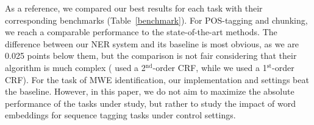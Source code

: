 As a reference, we compared our best results for each task with their corresponding benchmarks (Table~\ref{benchmark}). 
For POS-tagging and chunking, we reach a comparable performance to the state-of-the-art methods.
The difference between our NER system and its baseline is most obvious, as we are 0.025 points below them, but the comparison is not fair considering that their algorithm is much complex
( used a 2$^{\text{nd}}$-order CRF, while we used a 1$^{\text{st}}$-order CRF).
For the task of MWE identification, our implementation and settings beat the baseline. 
However, in this paper, we do not aim to maximize the absolute performance of the tasks under 
study, but rather to study the impact of word embeddings for sequence tagging tasks under control settings.


